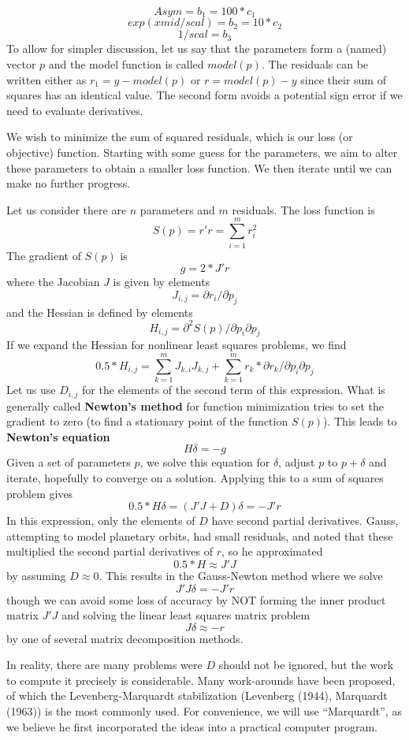 \[   Asym =  b_1 = 100 * c_1 \]
\[ exp(xmid/scal)  =  b_2 = 10 * c_2 \]
\[ 1/scal  =  b_3 \]
To allow for simpler discussion, let us say that the parameters form a (named) vector
\(p\) and the model function is called \(model(p)\). The residuals can be written
either as \(r_1 = y - model(p)\) or \(r = model(p) - y\)
since their sum of squares has an identical value. The second form
avoids a potential sign error if we need to evaluate derivatives.

We wish to minimize the sum of squared residuals, which is our loss (or objective) function.
Starting with some guess for the parameters, we aim to alter these parameters to obtain a smaller
loss function. We then iterate until we can make no further progress.

Let us consider there are \(n\) parameters and \(m\) residuals.
The loss function is
\[ S(p) = r' r = \sum_{i=1}^m { r_i^2 }\]
The gradient of \(S(p)\) is
\[ g = 2 * J' r\]
where the Jacobian \(J\) is given by elements
\[ J_{i,j} = \partial r_i / \partial p_j \]
and the Hessian is defined by elements
\[ H_{i,j} = \partial ^2 S(p) / {\partial p_i \partial p_j} \]
If we expand the Hessian for nonlinear least squares problems, we find
\[  0.5 * H_{i,j} = \sum_{k = 1}^m{ J_{k,i} J_{k,j}}  + \sum_{k = 1}^m {r_k * \partial{r_k}/{\partial p_i \partial p_j}}\]
Let us use \(D_{i,j}\) for the elements of the second term of this expression.
What is generally called \textbf{Newton's method} for function minimization tries
to set the gradient to zero (to find a stationary point of the function \(S(p)\)).
This leads to \textbf{Newton's equation}
\[ H \delta = -g \]
Given a set of parameters \(p\), we solve this equation for \(\delta\), adjust \(p\)
to \(p + \delta\) and iterate, hopefully to converge on a solution.
Applying this to a sum of squares problem gives
\[ 0.5 * H \delta = (J'J + D) \delta = - J' r\]
In this expression, only the elements of \(D\) have second partial derivatives.
Gauss, attempting to model planetary orbits, had small residuals, and noted
that these multiplied the second partial derivatives of \(r\), so he approximated
\[ 0.5 * H \approx J' J\]
by assuming \(D \approx 0\). This results in the Gauss-Newton method where we
solve
\[ J' J \delta = - J' r\]
though we can avoid some loss of accuracy by NOT forming the inner product matrix
\(J' J\) and solving the linear least squares matrix problem
\[ J \delta \approx -r \]
by one of several matrix decomposition methods.

In reality, there are many problems were \(D\) should not be ignored, but the work
to compute it precisely is considerable. Many work-arounds have been
proposed, of which the Levenberg-Marquardt stabilization
(Levenberg (1944), Marquardt (1963)) is
the most commonly used. For convenience, we will use ``Marquardt'', as we believe he
first incorporated the ideas into a practical computer program.

